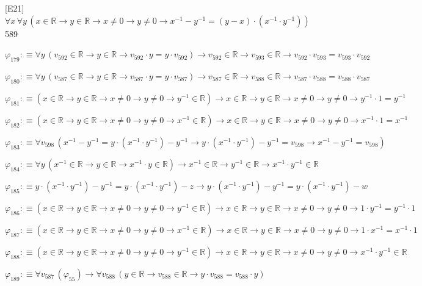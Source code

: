 \begin{fullproof}{[E21]}{$\forall x\,\forall y\,(x \in \mathbb{R} \to y \in \mathbb{R} \to x \neq 0 \to y \neq 0 \to x^{-1} - y^{-1} = (y - x) \cdot (x^{-1} \cdot y^{-1}))$}{589}
\begin{abbrevlist}
\item $\varphi_{179} :\equiv \forall y\,(v_{592} \in \mathbb{R} \to y \in \mathbb{R} \to v_{592} \cdot y = y \cdot v_{592}) \to v_{592} \in \mathbb{R} \to v_{593} \in \mathbb{R} \to v_{592} \cdot v_{593} = v_{593} \cdot v_{592}$
\item $\varphi_{180} :\equiv \forall y\,(v_{587} \in \mathbb{R} \to y \in \mathbb{R} \to v_{587} \cdot y = y \cdot v_{587}) \to v_{587} \in \mathbb{R} \to v_{588} \in \mathbb{R} \to v_{587} \cdot v_{588} = v_{588} \cdot v_{587}$
\item $\varphi_{181} :\equiv (x \in \mathbb{R} \to y \in \mathbb{R} \to x \neq 0 \to y \neq 0 \to y^{-1} \in \mathbb{R}) \to x \in \mathbb{R} \to y \in \mathbb{R} \to x \neq 0 \to y \neq 0 \to y^{-1} \cdot 1 = y^{-1}$
\item $\varphi_{182} :\equiv (x \in \mathbb{R} \to y \in \mathbb{R} \to x \neq 0 \to y \neq 0 \to x^{-1} \in \mathbb{R}) \to x \in \mathbb{R} \to y \in \mathbb{R} \to x \neq 0 \to y \neq 0 \to x^{-1} \cdot 1 = x^{-1}$
\item $\varphi_{183} :\equiv \forall v_{598}\,(x^{-1} - y^{-1} = y \cdot (x^{-1} \cdot y^{-1}) - y^{-1} \to y \cdot (x^{-1} \cdot y^{-1}) - y^{-1} = v_{598} \to x^{-1} - y^{-1} = v_{598})$
\item $\varphi_{184} :\equiv \forall y\,(x^{-1} \in \mathbb{R} \to y \in \mathbb{R} \to x^{-1} \cdot y \in \mathbb{R}) \to x^{-1} \in \mathbb{R} \to y^{-1} \in \mathbb{R} \to x^{-1} \cdot y^{-1} \in \mathbb{R}$
\item $\varphi_{185} :\equiv y \cdot (x^{-1} \cdot y^{-1}) - y^{-1} = y \cdot (x^{-1} \cdot y^{-1}) - z \to y \cdot (x^{-1} \cdot y^{-1}) - y^{-1} = y \cdot (x^{-1} \cdot y^{-1}) - w$
\item $\varphi_{186} :\equiv (x \in \mathbb{R} \to y \in \mathbb{R} \to x \neq 0 \to y \neq 0 \to y^{-1} \in \mathbb{R}) \to x \in \mathbb{R} \to y \in \mathbb{R} \to x \neq 0 \to y \neq 0 \to 1 \cdot y^{-1} = y^{-1} \cdot 1$
\item $\varphi_{187} :\equiv (x \in \mathbb{R} \to y \in \mathbb{R} \to x \neq 0 \to y \neq 0 \to x^{-1} \in \mathbb{R}) \to x \in \mathbb{R} \to y \in \mathbb{R} \to x \neq 0 \to y \neq 0 \to 1 \cdot x^{-1} = x^{-1} \cdot 1$
\item $\varphi_{188} :\equiv (x \in \mathbb{R} \to y \in \mathbb{R} \to x \neq 0 \to y \neq 0 \to y^{-1} \in \mathbb{R}) \to x \in \mathbb{R} \to y \in \mathbb{R} \to x \neq 0 \to y \neq 0 \to x^{-1} \cdot y^{-1} \in \mathbb{R}$
\item $\varphi_{189} :\equiv \forall v_{587}\,(\varphi_{55}) \to \forall v_{588}\,(y \in \mathbb{R} \to v_{588} \in \mathbb{R} \to y \cdot v_{588} = v_{588} \cdot y)$

\end{abbrevlist}
\end{fullproof}
